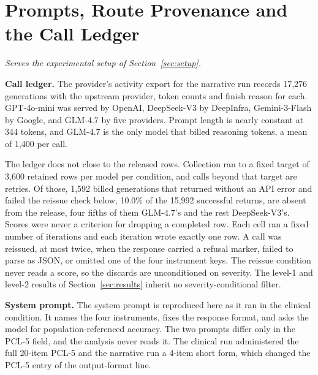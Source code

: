\documentclass[wcp]{jmlr}
\begin{document}
\label{gate:bodyend}



\appendix
\raggedbottom

\section{Prompts, Route Provenance and the Call Ledger}
\label{app:prompts}
\noindent\emph{Serves the experimental setup of Section~\ref{sec:setup}.}

\textbf{Call ledger.} The provider's activity export for the narrative run records 17,276
generations with the upstream provider, token counts and finish reason for each. GPT-4o-mini was
served by OpenAI, DeepSeek-V3 by DeepInfra, Gemini-3-Flash by Google, and GLM-4.7 by five providers.
Prompt length is nearly constant at 344 tokens, and GLM-4.7 is the only model that billed reasoning tokens, a mean of 1,400 per call.

The ledger does not close to the released rows. Collection ran to a fixed target of 3,600 retained rows per model per condition, and calls beyond that target are retries. Of those, 1,592 billed generations that returned without an API error and failed the reissue check below, 10.0\% of the 15,992 successful returns, are absent from the release, four fifths of them GLM-4.7's and the rest DeepSeek-V3's. Scores were never a criterion for dropping a completed row. Each cell ran a fixed number of iterations and each iteration wrote exactly one row. A call was reissued, at most twice, when the response carried a refusal marker, failed to parse as JSON, or omitted one of the four instrument keys. The reissue condition never reads a score, so the discards are unconditioned on severity. The level-1 and level-2 results of Section~\ref{sec:results} inherit no severity-conditional filter.

\textbf{System prompt.} The system prompt is reproduced here as it ran in the clinical condition. It names the four instruments, fixes the response format, and asks the model for population-referenced accuracy. The two prompts differ only in the PCL-5 field, and the analysis never reads it. The clinical run administered the full 20-item PCL-5 and the narrative run a 4-item short form, which changed the PCL-5 entry of the output-format line.
\end{document}
